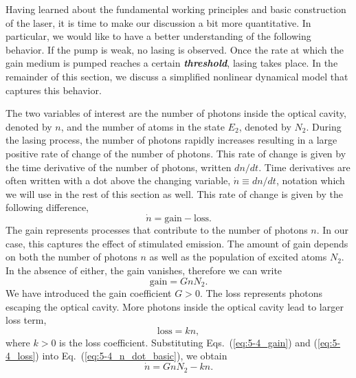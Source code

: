 Having learned about the fundamental working principles and basic construction of the laser, it is time to make our discussion a bit more quantitative.
In particular, we would like to have a better understanding of the following behavior.
If the pump is weak, no lasing is observed.
Once the rate at which the gain medium is pumped reaches a certain \textbf{\emph{threshold}}, lasing takes place.
In the remainder of this section, we discuss a simplified nonlinear dynamical model that captures this behavior.

The two variables of interest are the number of photons inside the optical cavity, denoted by $n$, and the number of atoms in the state $E_2$, denoted by $N_2$.
During the lasing process, the number of photons rapidly increases resulting in a large positive rate of change of the number of photons.
This rate of change is given by the time derivative of the number of photons, written $dn/dt$.
Time derivatives are often written with a dot above the changing variable, $\dot{n} \equiv dn/dt$, notation which we will use in the rest of this section as well.
This rate of change is given by the following difference,
\begin{equation}
    \dot{n} = \text{gain} - \text{loss}.
    \label{eq:5-4_n_dot_basic}
\end{equation}
The gain represents processes that contribute to the number of photons $n$.
In our case, this captures the effect of stimulated emission.
The amount of gain depends on both the number of photons $n$ as well as the population of excited atoms $N_2$.
In the absence of either, the gain vanishes, therefore we can write
\begin{equation}
    \text{gain} = G n  N_2.
    \label{eq:5-4_gain}
\end{equation}
We have introduced the gain coefficient $G>0$.
The loss represents photons escaping the optical cavity.
More photons inside the optical cavity lead to larger loss term,
\begin{equation}
    \text{loss} = k n,
    \label{eq:5-4_loss}
\end{equation}
where $k>0$ is the loss coefficient.
Substituting Eqs.~(\ref{eq:5-4_gain}) and (\ref{eq:5-4_loss}) into Eq.~(\ref{eq:5-4_n_dot_basic}), we obtain
\begin{equation}
    \dot{n} = G n N_2 - k n.
    \label{eq:5-4_n_dot_detailed}
\end{equation}

